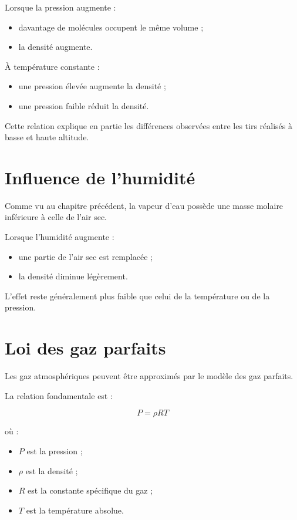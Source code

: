 Lorsque la pression augmente :

\begin{itemize}
\item davantage de molécules occupent le même volume ;
\item la densité augmente.
\end{itemize}

À température constante :

\begin{itemize}
\item une pression élevée augmente la densité ;
\item une pression faible réduit la densité.
\end{itemize}

Cette relation explique en partie les différences observées entre les tirs
réalisés à basse et haute altitude.

\section{Influence de l'humidité}

Comme vu au chapitre précédent, la vapeur d'eau possède une masse molaire
inférieure à celle de l'air sec.

Lorsque l'humidité augmente :

\begin{itemize}
\item une partie de l'air sec est remplacée ;
\item la densité diminue légèrement.
\end{itemize}

L'effet reste généralement plus faible que celui de la température ou de la
pression.

\section{Loi des gaz parfaits}

Les gaz atmosphériques peuvent être approximés par le modèle des gaz
parfaits.

\begin{rigueur}

La relation fondamentale est :

\begin{equation}
P = \rho R T
\label{eq:gaz_parfait}
\end{equation}

où :

\begin{itemize}
\item $P$ est la pression ;
\item $\rho$ est la densité ;
\item $R$ est la constante spécifique du gaz ;
\item $T$ est la température absolue.
\end{itemize}

\end{rigueur}


